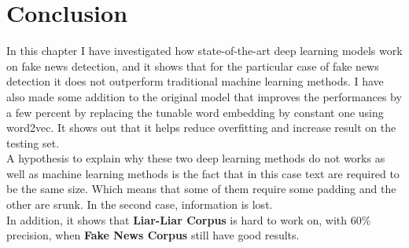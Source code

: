 \section{Conclusion}
In this chapter I have investigated how state-of-the-art deep learning models work on fake news detection, and it shows that for the particular case of fake news detection it does not outperform traditional machine learning methods. I have also made some addition to the original model that improves the performances by a few percent by replacing the tunable word embedding by constant one using word2vec. It shows out that it helps reduce overfitting and increase result on the testing set. \\
A hypothesis to explain why these two deep learning methods do not works as well as machine learning methods is the fact that in this case text are required to be the same size. Which means that some of them require some padding and the other are srunk. In the second case, information is lost. \\
In addition, it shows that \textbf{Liar-Liar Corpus} is hard to work on, with $60\%$ precision, when \textbf{Fake News Corpus} still have good results. 